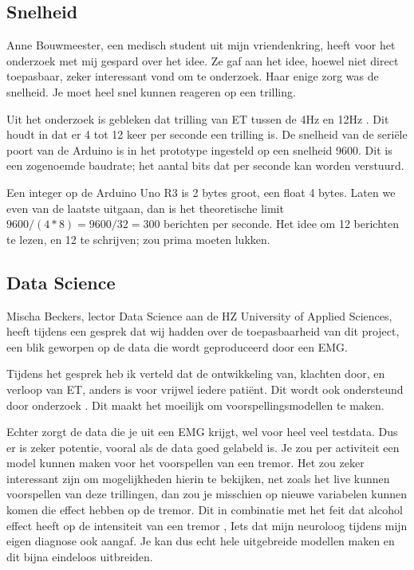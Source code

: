 \subsection*{Snelheid}

Anne Bouwmeester, een medisch student uit mijn vriendenkring, 
heeft voor het onderzoek met mij gespard over het idee.
Ze gaf aan het idee, hoewel niet direct toepasbaar, zeker interessant vond om te onderzoek.
Haar enige zorg was de snelheid. Je moet heel snel kunnen reageren op een trilling.

Uit het onderzoek is gebleken dat trilling van ET tussen de 4Hz en 12Hz \cite{frontiers2022}.
Dit houdt in dat er 4 tot 12 keer per seconde een trilling is.
De snelheid van de seriële poort van de Arduino is in het prototype ingesteld op een snelheid 9600.
Dit is een zogenoemde baudrate; het aantal bits dat per seconde kan worden verstuurd.

Een integer op de Arduino Uno R3 is 2 bytes groot, een float 4 bytes.
Laten we even van de laatste uitgaan,
dan is het theoretische limit $9600 / (4 * 8) = 9600 / 32 = 300$ berichten per seconde.
Het idee om 12 berichten te lezen, en 12 te schrijven; zou prima moeten lukken.

\subsection*{Data Science}

Mischa Beckers, lector Data Science aan de HZ University of Applied Sciences, 
heeft tijdens een gesprek dat wij hadden over de toepasbaarheid van dit project,
een blik geworpen op de data die wordt geproduceerd door een EMG.

Tijdens het gesprek heb ik verteld dat de ontwikkeling van, klachten door, en verloop van ET,
anders is voor vrijwel iedere patiënt. Dit wordt ook ondersteund door onderzoek
\cite{knf2022,erasmus2022,elsevier2022,frontiers2022,sips2024,activinsights2022}.
Dit maakt het moeilijk om voorspellingsmodellen te maken.

Echter zorgt de data die je uit een EMG krijgt, wel voor heel veel testdata.
Dus er is zeker potentie, vooral als de data goed gelabeld is.
Je zou per activiteit een model kunnen maken voor het voorspellen van een tremor.
Het zou zeker interessant zijn om mogelijkheden hierin te bekijken,
net zoals het live kunnen voorspellen van deze trillingen,
dan zou je misschien op nieuwe variabelen kunnen komen die effect hebben op de tremor.
Dit in combinatie met het feit dat alcohol effect heeft op de intensiteit van een tremor \cite{erasmus2022,elsevier2022},
Iets dat mijn neuroloog tijdens mijn eigen diagnose ook aangaf.
Je kan dus echt hele uitgebreide modellen maken en dit bijna eindeloos uitbreiden.

